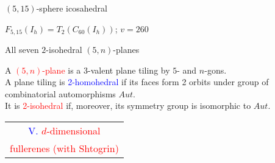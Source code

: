 \documentclass[%
pdf,
colorBG,
slideColor,
]{prosper}
\begin{document}
\begin{slide}{$(5,15)$-sphere icosahedral}
\begin{center}
\begin{minipage}{5.5cm}
\centering
{}\par
\end{minipage}
\hspace{0.1cm}
\begin{minipage}{5.5cm}
\centering
{}\par
\end{minipage}
\end{center}
\begin{center}
$F_{5,15}(I_h) = T_2(C_{60}(I_h))$; $v=260$
\end{center}
\end{slide}

\begin{slide}{All seven $2$-isohedral $(5,n)$-planes}
\begin{center}
\begin{minipage}{5.8cm}
\centering
{}\par
\end{minipage}
\begin{minipage}{5.4cm}
A \textcolor{red}{$(5,n)$-plane} is a $3$-valent plane tiling by $5$- 
and $n$-gons.\\
A plane tiling is \textcolor{blue}{2-homohedral} if its faces
form 2 orbits under group of combinatorial automorphisms $Aut$.\\
It is \textcolor{red}{2-isohedral} if, moreover, its symmetry
group is isomorphic to $Aut$.
\end{minipage}
\end{center}

\end{slide}



\begin{slide}{}
\begin{center}
{\Huge 
\begin{tabular*}{10cm}{c}
\\[-0.5cm]
\textcolor{blue}{V. }\textcolor{red}{$d$-dimensional}\\
\textcolor{red}{fullerenes (with Shtogrin)}
\end{tabular*}
}
\end{center}
\end{slide}
\end{document}
